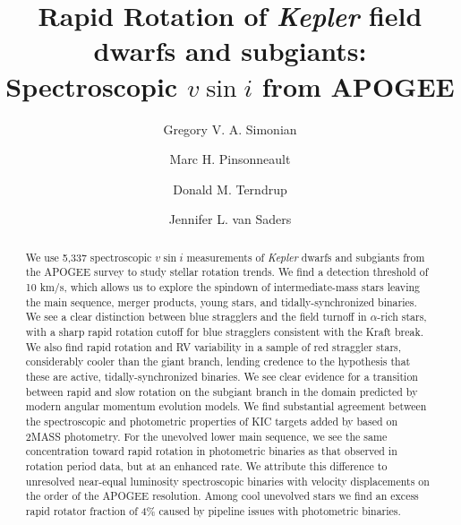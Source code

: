 \documentclass[preprint2]{aastex62}
\newcommand{\vsini}{\ensuremath{v \sin i}}
\newcommand{\Kepler}{\mbox{\textit{Kepler}}}
\begin{document}
\title{Rapid Rotation of \Kepler{} field dwarfs and subgiants: Spectroscopic 
    \vsini{} from APOGEE}
\author[0000-0002-4230-6732]{Gregory V. A. Simonian}

\author[0000-0002-7549-7766]{Marc H. Pinsonneault}

\author[0000-0002-0431-1645]{Donald M. Terndrup}

\author[0000-0002-4284-8638]{Jennifer L. van Saders}


\begin{abstract}
  We use 5,337 spectroscopic \vsini{} measurements of \Kepler{} dwarfs and
  subgiants from the APOGEE survey to study stellar rotation trends. We 
  find a detection threshold of 10 km/s, which allows us to explore
  the spindown of intermediate-mass stars leaving the main sequence, merger
  products, young stars, and tidally-synchronized binaries. We see a clear 
  distinction between blue stragglers and the field turnoff in \(\alpha\)-rich 
  stars, with a sharp rapid rotation cutoff for blue stragglers consistent with 
  the Kraft break. We also find rapid rotation and RV variability in a sample 
  of red straggler stars, considerably cooler than the giant branch, lending 
  credence to the hypothesis that these are active, tidally-synchronized 
  binaries. We see clear evidence for a transition between rapid and slow 
  rotation on the subgiant branch in the domain predicted by modern angular 
  momentum evolution models. We find substantial agreement between the 
  spectroscopic and photometric properties of KIC targets added by 
  \citet{Huber14} based on 2MASS photometry. For the unevolved lower main 
  sequence, we see the same concentration toward rapid rotation in photometric 
  binaries as that observed in rotation period data, but at an enhanced rate. 
  We attribute this difference to unresolved near-equal luminosity 
  spectroscopic binaries with velocity displacements on the order of the 
  APOGEE resolution. Among cool unevolved stars we find an excess rapid 
  rotator fraction of 4\% caused by pipeline issues with photometric binaries.
\end{abstract}
\end{document}
